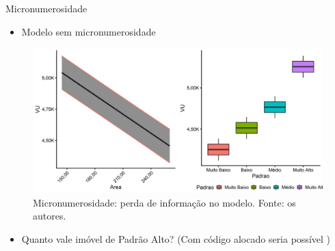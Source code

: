 \documentclass[9pt,ignorenonframetext,aspectratio=169]{beamer}
\providecommand{\tightlist}{%
  \setlength{\itemsep}{0pt}\setlength{\parskip}{0pt}}
\begin{document}
\begin{frame}{Micronumerosidade}
\protect\hypertarget{micronumerosidade}{}

\begin{itemize}[<+->]
\tightlist
\item
  \alert<1>{Modelo sem micronumerosidade}
\end{itemize}

\begin{figure}

{\centering \includegraphics[width=0.7\linewidth]{../../images/modelo-1} 

}

\caption{Micronumerosidade: perda de informação no modelo. Fonte: os autores.}\label{fig:unnamed-chunk-10}
\end{figure}

\begin{itemize}[<+->]
\tightlist
\item
  \alert<2>{Quanto vale imóvel de Padrão Alto? (Com código alocado seria possível \cite[A.6]{NBR1465302})}
\end{itemize}

\end{frame}
\end{document}
